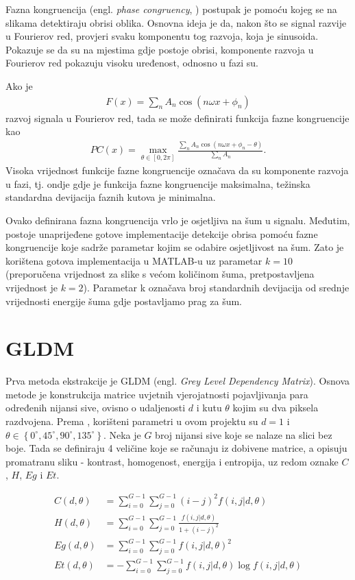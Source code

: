 \documentclass{report}
\begin{document}
Fazna kongruencija (engl. \textit{phase congruency}, \cite{phasecong}) postupak je pomoću kojeg se na slikama detektiraju obrisi oblika. Osnovna ideja je da, nakon što se signal razvije u Fourierov red, provjeri svaku komponentu tog razvoja, koja je sinusoida. Pokazuje se da su na mjestima gdje postoje obrisi, komponente razvoja u Fourierov red pokazuju visoku uređenost, odnosno u fazi su.

Ako je  
\begin{align*}
F(x) = \sum_n A_n\cos(n \omega x + \phi_n)
\end{align*}
razvoj signala u Fourierov red, tada se može definirati funkcija fazne kongruencije kao
\begin{align*}
PC(x) = \max_{\theta \in [0, 2\pi]}\frac{\sum_n A_n \cos(n \omega x + \phi_n - \theta)}{\sum_n A_n}.
\end{align*}
Visoka vrijednost funkcije fazne kongruencije označava da su komponente razvoja u fazi, tj. ondje gdje je funkcija fazne kongruencije maksimalna, težinska standardna devijacija faznih kutova je minimalna.

Ovako definirana fazna kongruencija vrlo je osjetljiva na šum u signalu. Međutim, postoje unaprijeđene gotove implementacije detekcije obrisa pomoću fazne kongruencije koje sadrže parametar kojim se odabire osjetljivost na šum. Zato je korištena gotova implementacija u MATLAB-u uz parametar $k = 10$ (preporučena vrijednost za slike s većom količinom šuma, pretpostavljena vrijednost je $k = 2$). Parametar k označava broj standardnih devijacija od srednje vrijednosti energije šuma gdje postavljamo prag za šum. 

\section{GLDM}
Prva metoda ekstrakcije je GLDM (engl. \textit{Grey Level Dependency Matrix}). Osnova metode je konstrukcija matrice uvjetnih vjerojatnosti pojavljivanja para određenih nijansi sive, ovisno o udaljenosti $d$ i kutu $\theta$ kojim su dva piksela razdvojena. Prema \cite{main_paper}, korišteni parametri u ovom projektu su $d = 1$ i $\theta \in \left\lbrace0^\circ, 45^\circ, 90^\circ, 135^\circ\right\rbrace$.
Neka je $G$ broj nijansi sive koje se nalaze na slici bez boje. Tada se definiraju 4 veličine koje se računaju iz dobivene matrice, a opisuju promatranu sliku - kontrast, homogenost, energija i entropija, uz redom oznake $C$, $H$, $Eg$ i $Et$.

\begin{align*}
C(d, \theta) &= \sum_{i=0}^{G-1}\sum_{j=0}^{G-1}(i-j)^2f(i,j|d, \theta)\\
H(d, \theta) &= \sum_{i=0}^{G-1}\sum_{j=0}^{G-1}\frac{f(i,j|d, \theta)}{1 + (i-j)^2}\\
Eg(d, \theta) &= \sum_{i=0}^{G-1}\sum_{j=0}^{G-1}f(i,j|d, \theta)^2\\
Et(d, \theta) &= -\sum_{i=0}^{G-1}\sum_{j=0}^{G-1}f(i,j|d, \theta)\log f(i, j |d, \theta)\\
\end{align*}
\end{document}
